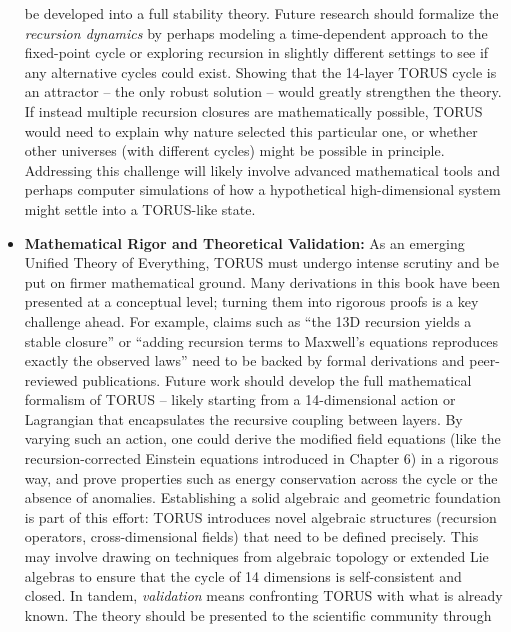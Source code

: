 \documentclass[
]{article}
\begin{document}
\begin{itemize}
  be developed into a full stability theory\hspace{0pt}. Future research
  should formalize the \emph{recursion dynamics} by perhaps modeling a
  time-dependent approach to the fixed-point cycle or exploring
  recursion in slightly different settings to see if any alternative
  cycles could exist. Showing that the 14-layer TORUS cycle is an
  attractor -- the only robust solution -- would greatly strengthen the
  theory. If instead multiple recursion closures are mathematically
  possible, TORUS would need to explain why nature selected this
  particular one, or whether other universes (with different cycles)
  might be possible in principle. Addressing this challenge will likely
  involve advanced mathematical tools and perhaps computer simulations
  of how a hypothetical high-dimensional system might settle into a
  TORUS-like state.
\item
  \textbf{Mathematical Rigor and Theoretical Validation:} As an emerging
  Unified Theory of Everything, TORUS must undergo intense scrutiny and
  be put on firmer mathematical ground. Many derivations in this book
  have been presented at a conceptual level; turning them into rigorous
  proofs is a key challenge ahead\hspace{0pt}. For example, claims such
  as ``the 13D recursion yields a stable closure'' or ``adding recursion
  terms to Maxwell's equations reproduces exactly the observed laws''
  need to be backed by formal derivations and peer-reviewed
  publications. Future work should develop the full mathematical
  formalism of TORUS -- likely starting from a 14-dimensional action or
  Lagrangian that encapsulates the recursive coupling between
  layers\hspace{0pt}. By varying such an action, one could derive the
  modified field equations (like the recursion-corrected Einstein
  equations introduced in Chapter 6) in a rigorous way, and prove
  properties such as energy conservation across the cycle or the absence
  of anomalies. Establishing a solid algebraic and geometric foundation
  is part of this effort: TORUS introduces novel algebraic structures
  (recursion operators, cross-dimensional fields) that need to be
  defined precisely. This may involve drawing on techniques from
  algebraic topology or extended Lie algebras to ensure that the cycle
  of 14 dimensions is self-consistent and closed\hspace{0pt}. In tandem,
  \emph{validation} means confronting TORUS with what is already known.
  The theory should be presented to the scientific community through

\end{itemize}
\end{document}
